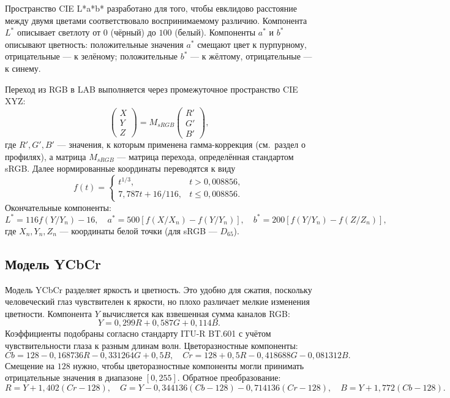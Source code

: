 \documentclass[a4paper,12pt]{article}
\begin{document}
Пространство CIE L*a*b* разработано для того, чтобы евклидово расстояние между двумя цветами соответствовало воспринимаемому различию. Компонента $L^*$ описывает светлоту от $0$ (чёрный) до $100$ (белый). Компоненты $a^*$ и $b^*$ описывают цветность: положительные значения $a^*$ смещают цвет к пурпурному, отрицательные --- к зелёному; положительные $b^*$ --- к жёлтому, отрицательные --- к синему.

Переход из RGB в LAB выполняется через промежуточное пространство CIE XYZ:
\[
\begin{pmatrix} X \\ Y \\ Z \end{pmatrix}
= M_{sRGB} \begin{pmatrix} R' \\ G' \\ B' \end{pmatrix},
\]
где $R', G', B'$ --- значения, к которым применена гамма-коррекция (см.~раздел о профилях), а матрица $M_{sRGB}$ --- матрица перехода, определённая стандартом sRGB. Далее нормированные координаты переводятся к виду
\[
f(t) = \begin{cases} t^{1/3}, & t > 0{,}008856, \\ 7{,}787 t + 16/116, & t \le 0{,}008856. \end{cases}
\]
Окончательные компоненты:
\[
L^* = 116 f(Y / Y_n) - 16, \quad
a^* = 500 [f(X / X_n) - f(Y / Y_n)], \quad
b^* = 200 [f(Y / Y_n) - f(Z / Z_n)],
\]
где $X_n, Y_n, Z_n$ --- координаты белой точки (для sRGB --- $D_{65}$).

\subsection{Модель YCbCr}

Модель YCbCr разделяет яркость и цветность. Это удобно для сжатия, поскольку человеческий глаз чувствителен к яркости, но плохо различает мелкие изменения цветности. Компонента $Y$ вычисляется как взвешенная сумма каналов RGB:
\[
Y = 0{,}299 R + 0{,}587 G + 0{,}114 B.
\]
Коэффициенты подобраны согласно стандарту ITU-R BT.601 с учётом чувствительности глаза к разным длинам волн. Цветоразностные компоненты:
\[
Cb = 128 - 0{,}168736 R - 0{,}331264 G + 0{,}5 B, \quad
Cr = 128 + 0{,}5 R - 0{,}418688 G - 0{,}081312 B.
\]
Смещение на $128$ нужно, чтобы цветоразностные компоненты могли принимать отрицательные значения в диапазоне $[0, 255]$. Обратное преобразование:
\[
R = Y + 1{,}402 (Cr - 128), \quad
G = Y - 0{,}344136 (Cb - 128) - 0{,}714136 (Cr - 128), \quad
B = Y + 1{,}772 (Cb - 128).
\]
\end{document}
